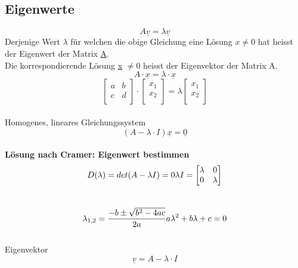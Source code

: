 \subsection{Eigenwerte}
\[
	A\underline{v} = \lambda \underline{v}
\]
Derjenige Wert $\lambda$ für welchen die obige Gleichung eine Lösung $x\neq 0$ hat heisst der Eigenwert der Matrix \underline{A}. 
\\Die korrespondierende Lösung \underline{x} $\neq 0$ heisst der Eigenvektor der Matrix A.
\\
\[
	A \cdot \underline{x }=\lambda \cdot \underline{x}
\]
\[
		\begin{bmatrix}
			a & b  \\
			c & d  \\
		\end{bmatrix}
		\cdot	
		\begin{bmatrix}
				x_1 \\
				x_2 \\
		\end{bmatrix}
		=
		\lambda
		\begin{bmatrix}
				x_1 \\
				x_2 \\
		\end{bmatrix}
\]
\\
Homogenes, lineares Gleichungssystem
\[
	(A-\lambda\cdot I) \underline{x} = \underline{0}
\]
\\
\textbf{Lösung nach Cramer: Eigenwert bestimmen}
\[
		D(\lambda)=det(A-\lambda I)= 0	\\	\lambda I = \begin{bmatrix}
			\lambda & 0  \\
			0 & \lambda  \\
		\end{bmatrix}
\]
\\
\[
		\lambda_{1,2}=\frac{-b\pm \sqrt{b^2-4ac}}{2a}	\\	a	\lambda^2+b	\lambda+c=0
\]
\\
Eigenvektor
\[
		\underline{v}= A - \lambda \cdot I 
\]
\\
\\
